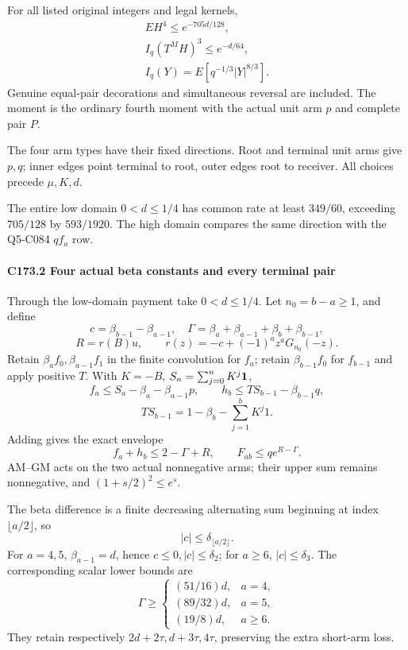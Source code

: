 For all listed original integers and legal kernels,
\[
\boxed{\begin{gathered}
EH^4\le e^{-705d/128},\qquad\\
I_q(T^MH)^3\le e^{-d/64},\quad\\
I_q(Y)=E[q^{-1/3}|Y|^{8/3}].
\end{gathered}}\tag{C173.T183.2}
\]
Genuine equal-pair decorations and simultaneous reversal are included. The moment is the ordinary fourth moment with the actual unit arm \(p\) and complete pair \(P\).

The four arm types have their fixed directions. Root and terminal unit arms give \(p,\allowbreak \allowbreak  q\); inner edges point terminal to root, outer edges root to receiver. All choices precede \(\mu,\allowbreak \allowbreak  K,\allowbreak \allowbreak  d\).

The entire low domain \(0<d\le1/4\) has common rate at least \(349/60\), exceeding \(705/128\) by \(593/1920\). The high domain compares the same direction with the Q5-C084 \(qf_a\) row.


\paragraph{C173.2 Four actual beta constants and every terminal pair}

Through the low-domain payment take \(0<d\le1/4\). Let \(n_0=b-a\ge1\), and define
\[
c=\beta_{b-1}-\beta_{a-1},\quad
\Gamma=\beta_a+\beta_{a-1}+\beta_b+\beta_{b-1},
\]
\[
R=r(B)u,\qquad r(z)=-c+(-1)^a z^aG_{n_0}(-z).       \tag{C173.T183.7}
\]
Retain \(\beta_af_0,\allowbreak \allowbreak  \beta_{a-1}f_1\) in the finite convolution for \(f_a\); retain \(\beta_{b-1}f_0\) for \(f_{b-1}\) and apply positive \(T\). With \(K=-B\), \(S_n=\sum_{j=0}^nK^j\mathbf1\),
\[
f_a\le S_a-\beta_a-\beta_{a-1}p,\qquad
h_b\le TS_{b-1}-\beta_{b-1}q,
\]
\[
TS_{b-1}=1-\beta_b-\sum_{j=1}^{b}K^j1.
\]
Adding gives the exact envelope
\[
f_a+h_b\le2-\Gamma+R,\qquad F_{ab}\le q e^{R-\Gamma}. \tag{C173.T183.8}
\]
AM--GM acts on the two actual nonnegative arms; their upper sum remains nonnegative, and \((1+s/2)^2\le e^s\).

The beta difference is a finite decreasing alternating sum beginning at index \(\lfloor a/2\rfloor\), so
\[
|c|\le \delta_{\lfloor a/2\rfloor}.
\]
For \(a=4,\allowbreak \allowbreak  5\), \(\beta_{a-1}=d\), hence \(c\le0,\allowbreak \allowbreak |c|\le \delta_2\); for \(a\ge6\), \(|c|\le \delta_3\). The corresponding scalar lower bounds are
\[
\Gamma\ge
\begin{cases}(51/16)d,&a=4,\\
(89/32)d,&a=5,\\
(19/8)d,&a\ge6.
\end{cases}                                        \tag{C173.T183.9}
\]
They retain respectively \(2d+2\tau,\allowbreak \allowbreak  d+3\tau,\allowbreak \allowbreak  4\tau\), preserving the extra short-arm loss.

